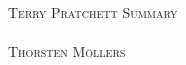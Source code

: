 \begin{titlepage}
\begin{center}
\textsc{\huge Terry Pratchett Summary} \\[2cm]
\HRule \\[1cm]
\textsc{\large Thorsten M\"ollers} \\[1cm]
\HRule \\[1cm]
\end{center}
\end{titlepage}
